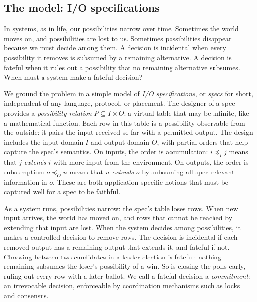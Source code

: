 \documentclass[sigconf]{cidr-2027}
\theoremstyle{remark}
\newcommand{\InputOrd}{\preceq_I}
\newcommand{\OutputOrd}{\preceq_O}
\newcommand{\commitment}{commitment\xspace}
\newcommand{\inrel}{extends\xspace}          %
\newcommand{\outrel}{extends\xspace}          %
\newcommand{\spectype}[1][]{I/O specification#1\xspace}
\newcommand{\Spectype}[1][]{I/O specification#1\xspace}
\begin{document}
\subsection{The model: \Spectype[s]}
\textcolor{reviewed}{In systems, as in life, our possibilities narrow over time.} \textcolor{reviewed}{Sometimes the world
moves on, and possibilities are lost to us.} \textcolor{reviewed}{Sometimes possibilities disappear
because we must decide among them.} A decision is incidental when
every possibility it removes is subsumed by a remaining alternative. \textcolor{reviewed}{A
decision is fateful when it rules out a possibility that no remaining alternative subsumes.} \textcolor{reviewed}{When must a system make a fateful decision?}

\textcolor{reviewed}{We ground the problem in a simple model of \emph{\spectype[s]}, or \emph{specs}
for short, independent of any language, protocol, or placement.} \textcolor{reviewed}{The designer of
a spec provides a \emph{possibility relation} $P\subseteq I\times O$: a virtual
table that may be infinite, like a mathematical function.} \textcolor{reviewed}{Each row in this table
is a possibility observable from the outside: it pairs the input received so far
with a permitted output.} \textcolor{reviewed}{The design includes the input domain $I$ and output domain $O$,
with partial orders that help capture the spec's semantics.} \textcolor{reviewed}{On inputs, the order
is accumulation: $i\InputOrd j$ means that $j$ \emph{\inrel} $i$ with more input
from the environment.} \textcolor{reviewed}{On outputs, the order is subsumption: $o\OutputOrd u$
means that  $u$ \emph{\outrel} $o$ by subsuming all spec-relevant information in
$o$.} \textcolor{reviewed}{These are both application-specific notions that must be captured well for
a spec to be faithful.}

\textcolor{reviewed}{As a system runs, possibilities narrow: the spec's table loses rows.} \textcolor{reviewed}{When new
input arrives, the world has moved on, and rows that cannot be reached by
extending that input are lost.} \textcolor{reviewed}{When the system decides among possibilities, it
makes a controlled decision to remove rows.} The decision is incidental if each
removed output has a remaining output that \outrel it, and fateful if
not. \textcolor{reviewed}{Choosing between two candidates in a leader election is fateful: nothing
remaining subsumes the loser's possibility of a win.} \textcolor{reviewed}{So is closing the polls early,
ruling out every row with a later ballot.} We call a fateful decision a
\emph{\commitment}: an irrevocable decision, enforceable by coordination
mechanisms such as locks and consensus.
\end{document}
